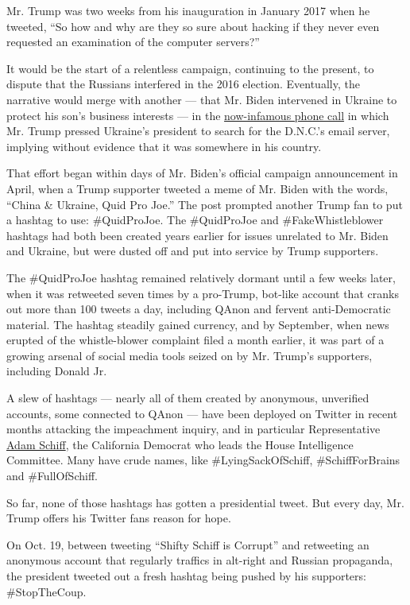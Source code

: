 Mr. Trump was two weeks from his inauguration in January 2017 when he
tweeted, ``So how and why are they so sure about hacking if they never
even requested an examination of the computer servers?''

It would be the start of a relentless campaign, continuing to the
present, to dispute that the Russians interfered in the 2016 election.
Eventually, the narrative would merge with another --- that Mr. Biden
intervened in Ukraine to protect his son's business interests --- in the
\href{https://www.nytimes.com/2019/10/08/us/politics/trump-ukraine-whistleblower.html}{now-infamous
phone call} in which Mr. Trump pressed Ukraine's president to search for
the D.N.C.'s email server, implying without evidence that it was
somewhere in his country.

That effort began within days of Mr. Biden's official campaign
announcement in April, when a Trump supporter tweeted a meme of Mr.
Biden with the words, ``China \& Ukraine, Quid Pro Joe.'' The post
prompted another Trump fan to put a hashtag to use: \#QuidProJoe. The
\#QuidProJoe and \#FakeWhistleblower hashtags had both been created
years earlier for issues unrelated to Mr. Biden and Ukraine, but were
dusted off and put into service by Trump supporters.

The \#QuidProJoe hashtag remained relatively dormant until a few weeks
later, when it was retweeted seven times by a pro-Trump, bot-like
account that cranks out more than 100 tweets a day, including QAnon and
fervent anti-Democratic material. The hashtag steadily gained currency,
and by September, when news erupted of the whistle-blower complaint
filed a month earlier, it was part of a growing arsenal of social media
tools seized on by Mr. Trump's supporters, including Donald Jr.

A slew of hashtags --- nearly all of them created by anonymous,
unverified accounts, some connected to QAnon --- have been deployed on
Twitter in recent months attacking the impeachment inquiry, and in
particular Representative
\href{https://www.npr.org/2019/10/10/768048653/adam-schiff-the-surprising-face-of-the-impeachment-inquiry-of-president-trump}{Adam
Schiff}, the California Democrat who leads the House Intelligence
Committee. Many have crude names, like \#LyingSackOfSchiff,
\#SchiffForBrains and \#FullOfSchiff.

So far, none of those hashtags has gotten a presidential tweet. But
every day, Mr. Trump offers his Twitter fans reason for hope.

On Oct. 19, between tweeting ``Shifty Schiff is Corrupt'' and retweeting
an anonymous account that regularly traffics in alt-right and Russian
propaganda, the president tweeted out a fresh hashtag being pushed by
his supporters: \#StopTheCoup.

